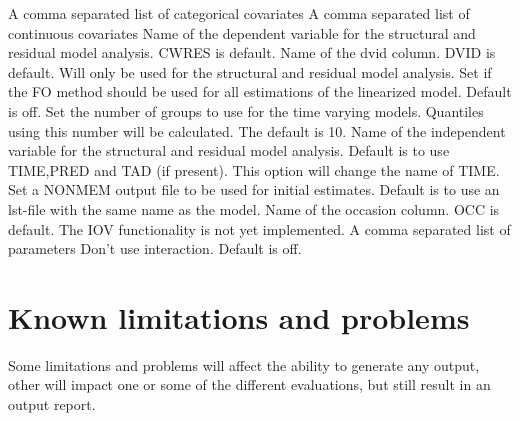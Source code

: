 \begin{optionlist}
A comma separated list of categorical covariates
\nextopt
{}
A comma separated list of continuous covariates
\nextopt
{}
Name of the dependent variable for the structural and residual model analysis. CWRES is default.
\nextopt
{}
Name of the dvid column. DVID is default.
Will only be used for the structural and residual model analysis.
\nextopt
{}
Set if the FO method should be used for all estimations
of the linearized model. Default is off.
\nextopt
{}
Set the number of groups to use for the time varying models.
Quantiles using this number will be calculated.
The default is 10.
\nextopt
{}
Name of the independent variable for the structural and residual model analysis.
Default is to use TIME,PRED and TAD (if present). This option will change the name
of TIME.
\nextopt
{}
Set a NONMEM output file to be used for initial estimates.
Default is to use an lst-file with the same name as the model.
\nextopt
{}
Name of the occasion column. OCC is default.
The IOV functionality is not yet implemented.
\nextopt
{}
A comma separated list of parameters
\nextopt
        Don't use interaction. Default is off.
    \nextopt
\end{optionlist}

\section{Known limitations and problems}

Some limitations and problems will affect the ability to generate any output, other will impact one or some of the different evaluations, but still result in an output report. 

